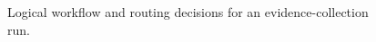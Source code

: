 \begin{figure}[H]
{\begin{tikzpicture}
\end{tikzpicture}
}
\caption{Logical workflow and routing decisions for an evidence-collection run.}\label{fig:logical-workflow}
\end{figure}
